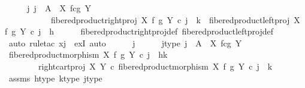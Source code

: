 \begin{isabellebody}
\ \ \isamarkupfalse%
\ \isamarkupfalse%
\ {\isachardoublequoteopen}{\isasymexists}j{\isachardot}{\kern0pt}\ j\ {\isacharcolon}{\kern0pt}\ A\ {\isasymrightarrow}\ X\ \isactrlbsub f\isactrlesub {\isasymtimes}\isactrlsub c\isactrlbsub g\isactrlesub \ Y\ {\isasymand}\isanewline
\ \ \ \ \ \ \ \ \ \ \ fibered{\isacharunderscore}{\kern0pt}product{\isacharunderscore}{\kern0pt}right{\isacharunderscore}{\kern0pt}proj\ X\ f\ g\ Y\ {\isasymcirc}\isactrlsub c\ j\ {\isacharequal}{\kern0pt}\ k\ {\isasymand}\ fibered{\isacharunderscore}{\kern0pt}product{\isacharunderscore}{\kern0pt}left{\isacharunderscore}{\kern0pt}proj\ X\ f\ g\ Y\ {\isasymcirc}\isactrlsub c\ j\ {\isacharequal}{\kern0pt}\ h{\isachardoublequoteclose}\isanewline
\ \ \ \ \isamarkupfalse%
\ fibered{\isacharunderscore}{\kern0pt}product{\isacharunderscore}{\kern0pt}right{\isacharunderscore}{\kern0pt}proj{\isacharunderscore}{\kern0pt}def\ fibered{\isacharunderscore}{\kern0pt}product{\isacharunderscore}{\kern0pt}left{\isacharunderscore}{\kern0pt}proj{\isacharunderscore}{\kern0pt}def\ \isanewline
\ \ \isamarkupfalse%
\ {\isacharparenleft}{\kern0pt}auto{\isacharcomma}{\kern0pt}\ rule{\isacharunderscore}{\kern0pt}tac\ x{\isacharequal}{\kern0pt}j\ \ exI{\isacharcomma}{\kern0pt}\ auto{\isacharparenright}{\kern0pt}\isanewline
\ \ \ \ \isamarkupfalse%
\ j\isanewline
\ \ \ \ \isamarkupfalse%
\ j{\isacharunderscore}{\kern0pt}type{\isacharcolon}{\kern0pt}\ {\isachardoublequoteopen}j\ {\isacharcolon}{\kern0pt}\ A\ {\isasymrightarrow}\ X\ \isactrlbsub f\isactrlesub {\isasymtimes}\isactrlsub c\isactrlbsub g\isactrlesub \ Y{\isachardoublequoteclose}\isanewline
\isanewline
\ \ \ \ \isamarkupfalse%
\ {\isachardoublequoteopen}fibered{\isacharunderscore}{\kern0pt}product{\isacharunderscore}{\kern0pt}morphism\ X\ f\ g\ Y\ {\isasymcirc}\isactrlsub c\ j\ {\isacharequal}{\kern0pt}\ {\isasymlangle}h{\isacharcomma}{\kern0pt}k{\isasymrangle}\ {\isasymLongrightarrow}\isanewline
\ \ \ \ \ \ \ \ {\isacharparenleft}{\kern0pt}right{\isacharunderscore}{\kern0pt}cart{\isacharunderscore}{\kern0pt}proj\ X\ Y\ {\isasymcirc}\isactrlsub c\ fibered{\isacharunderscore}{\kern0pt}product{\isacharunderscore}{\kern0pt}morphism\ X\ f\ g\ Y{\isacharparenright}{\kern0pt}\ {\isasymcirc}\isactrlsub c\ j\ {\isacharequal}{\kern0pt}\ k{\isachardoublequoteclose}\isanewline
\ \ \ \ \ \ \isamarkupfalse%
\ assms\ h{\isacharunderscore}{\kern0pt}type\ k{\isacharunderscore}{\kern0pt}type\ j{\isacharunderscore}{\kern0pt}type\isanewline

\end{isabellebody}
